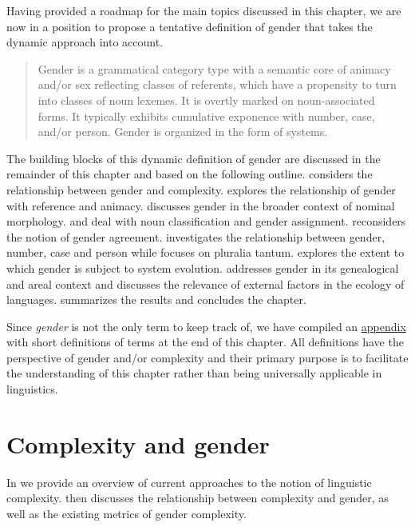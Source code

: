 \documentclass[output=collectionpaper]{langsci/langscibook}
\begin{document}
Having provided a roadmap for the main topics discussed in this chapter, we are now in a position to propose a tentative definition of gender that takes the dynamic approach into account.

\begin{quote}
Gender is a grammatical category type with a semantic core of animacy and/or sex reflecting classes of referents, which have a propensity to turn into classes of noun lexemes. It is overtly marked on noun-associated forms. It typically exhibits cumulative exponence with number, case, and/or person. Gender is organized in the form of systems.
\end{quote}

\noindent The building blocks of this dynamic definition of gender are discussed in the remainder of this chapter and based on the following outline.  considers the relationship between gender and complexity.  explores the relationship of gender with reference and animacy.  discusses gender in the broader context of nominal morphology.  and  deal with noun classification and gender assignment.  reconsiders the notion of gender agreement.  investigates the relationship between gender, number, case and person while  focuses on pluralia tantum.  explores the extent to which gender is subject to system evolution.  addresses gender in its genealogical and areal context and discusses the relevance of external factors in the ecology of languages.  summarizes the results and concludes the chapter.

Since \textit{gender} is not the only term to keep track of, we have compiled an \hyperref[WDG:appendix]{appendix} with short definitions of terms at the end of this chapter. All definitions have the perspective of gender and/or complexity and their primary purpose is to facilitate the understanding of this chapter rather than being universally applicable in linguistics.

\section{Complexity and gender}
\label{sec:WDG:2}

In  we provide an overview of current approaches to the notion of linguistic complexity.  then discusses the relationship between complexity and gender, as well as the existing metrics of gender complexity.
\end{document}
